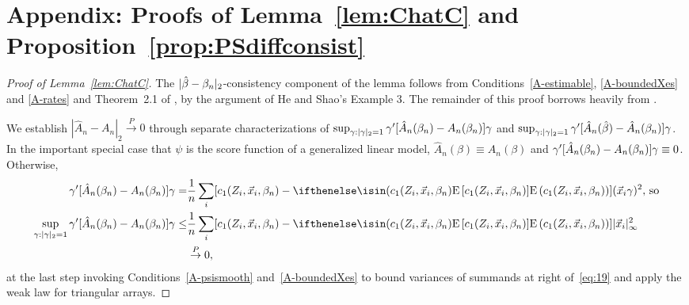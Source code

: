 \documentclass{article}
\theoremstyle{remark}
\begin{document}



\appendix

\section*{Appendix: Proofs of Lemma~\ref{lem:ChatC} and Proposition~\ref{prop:PSdiffconsist}}
\begin{proof}[Proof of Lemma~\ref{lem:ChatC}]
The $|\hat\beta - \beta_{n }|_{2}$-consistency component of the lemma follows from Conditions~\ref{A-estimable}, \ref{A-boundedXes}%
 and \ref{A-rates} and Theorem~2.1 of \citet{he2000parameters}, by the argument of He and Shao's Example 3.
The remainder of this proof borrows heavily from \citet[][Proof of Thm.~3.10]{wang2011gee}.

We establish $|\hat{A}_{n} - A_{n}|_{2} \stackrel{P}{\rightarrow} 0$ through separate characterizations of  
$\sup_{\gamma: |\gamma|_{2}=1}\gamma'[\hat{A}_{n}(\beta_{n }) - A_{n}(\beta_{n })]\gamma$ and $\sup_{\gamma: |\gamma|_{2}=1}\gamma'[\hat{A}_{n}(\hat\beta) - \hat{A}_{n}(\beta_{n })]\gamma$.  In the important special case that $\psi$ is the score function of a generalized linear model, $\hat{A}_{n}(\beta) \equiv A_{n}(\beta)$ and $\gamma'[\hat{A}_{n}(\beta_{n }) - A_{n}(\beta_{n })]\gamma \equiv 0$.  Otherwise, 
\begin{align}
  \gamma'[\hat{A}_{n}(\betatrue) - A_{n}(\betatrue)]\gamma =& \frac{1}{n} \sum_{i} [c_{1}(Z_{i}, \vec{x}_{i}, \betatrue) - \E{c_{1}(Z_{i}, \vec{x}_{i}, \betatrue)}](\vec{x}_{i}\gamma)^{2},\, \text{so} \nonumber \\
\sup_{\gamma: |\gamma|_{2}=1}\gamma'[\hat{A}_{n}(\betatrue) - A_{n}(\betatrue)]\gamma \leq&
\frac{1}{n} \sum_{i} [c_{1}(Z_{i}, \vec{x}_{i}, \betatrue) - \E{c_{1}(Z_{i}, \vec{x}_{i}, \betatrue)}]|\vec{x}_{i}|_{\infty}^{2} \label{eq:19}\\
& \stackrel{P}{\rightarrow} 0, \nonumber
\end{align}
at the last step invoking Conditions~\ref{A-psismooth} 
and~\ref{A-boundedXes}  %
to bound variances of summands at right of~\eqref{eq:19} and apply the weak law for triangular arrays. 


\end{proof}
\end{document}
